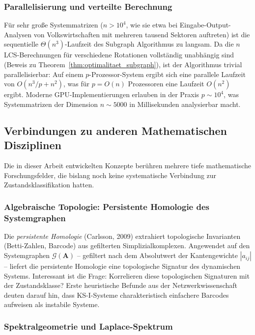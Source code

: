 \documentclass[a4paper, 12pt, twoside, openright]{report}
\theoremstyle{definition}
\theoremstyle{definition}
\newcommand{\vA}{\bm{A}}
\begin{document}
\subsubsection*{Parallelisierung und verteilte Berechnung}

Für sehr große Systemmatrizen ($n > 10^4$, wie sie etwa bei Eingabe-Output-Analysen
von Volkswirtschaften mit mehreren tausend Sektoren auftreten) ist die sequentielle
$\Theta(n^3)$-Laufzeit des Subgraph Algorithmus zu langsam. Da die $n$ LCS-Berechnungen
für verschiedene Rotationen vollständig unabhängig sind (Beweis zu
Theorem~\ref{thm:optimalitaet_subgraph}), ist der Algorithmus trivial parallelisierbar:
Auf einem $p$-Prozessor-System ergibt sich eine parallele Laufzeit von
$O(n^3/p + n^2)$, was für $p = O(n)$ Prozessoren eine Laufzeit $O(n^2)$ ergibt.
Moderne GPU-Implementierungen erlauben in der Praxis $p \sim 10^4$, was
Systemmatrizen der Dimension $n \sim 5000$ in Millisekunden analysierbar macht.

\subsection{Verbindungen zu anderen Mathematischen Disziplinen}
\label{subsec:math_verbindungen}

Die in dieser Arbeit entwickelten Konzepte berühren mehrere tiefe mathematische
Forschungsfelder, die bislang noch keine systematische Verbindung zur Zustandsklassifikation
hatten.

\subsubsection*{Algebraische Topologie: Persistente Homologie des Systemgraphen}

Die \emph{persistente Homologie} (Carlsson, 2009) extrahiert topologische
Invarianten (Betti-Zahlen, Barcode) aus gefilterten Simplizialkomplexen. Angewendet
auf den Systemgraphen $\mathcal{G}(\vA)$ -- gefiltert nach dem Absolutwert der
Kantengewichte $|a_{ij}|$ -- liefert die persistente Homologie eine
topologische Signatur des dynamischen Systems. Interessant ist die Frage: Korrelieren
diese topologischen Signaturen mit der Zustandsklasse? Erste heuristische Befunde
aus der Netzwerkwissenschaft deuten darauf hin, dass KS-I-Systeme charakteristisch
einfachere Barcodes aufweisen als instabile Systeme.

\subsubsection*{Spektralgeometrie und Laplace-Spektrum}
\end{document}
